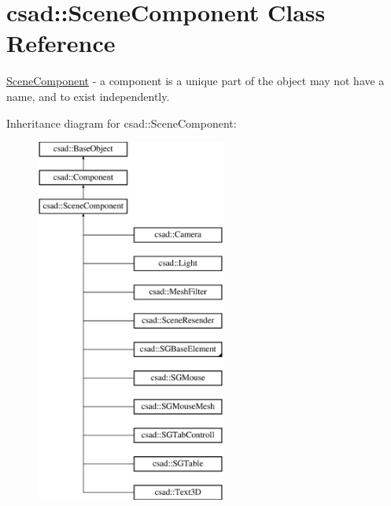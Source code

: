 \hypertarget{classcsad_1_1_scene_component}{\section{csad\-:\-:Scene\-Component Class Reference}
\label{classcsad_1_1_scene_component}
}


\hyperlink{classcsad_1_1_scene_component}{Scene\-Component} -\/ a component is a unique part of the object may not have a name, and to exist independently.  


Inheritance diagram for csad\-:\-:Scene\-Component\-:\begin{figure}[H]
\begin{center}
\leavevmode
\includegraphics[height=12.000000cm]{classcsad_1_1_scene_component}
\end{center}
\end{figure}
